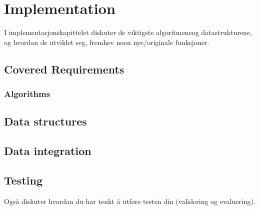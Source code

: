 
\chapter{Implementation}

\minitoc

I implementasjonskapittelet diskuter de viktigste
algoritmeneog datastrukturene,
og hvordan de utviklet seg,
fremhev noen nye/originale funksjoner.

\clearpage

\section{Covered Requirements}
\subsection{Algorithms}

\section{Data structures}

\section{Data integration}

\section{Testing}
Også diskuter hvordan du har tenkt å utføre testen din (validering og evaluering).
